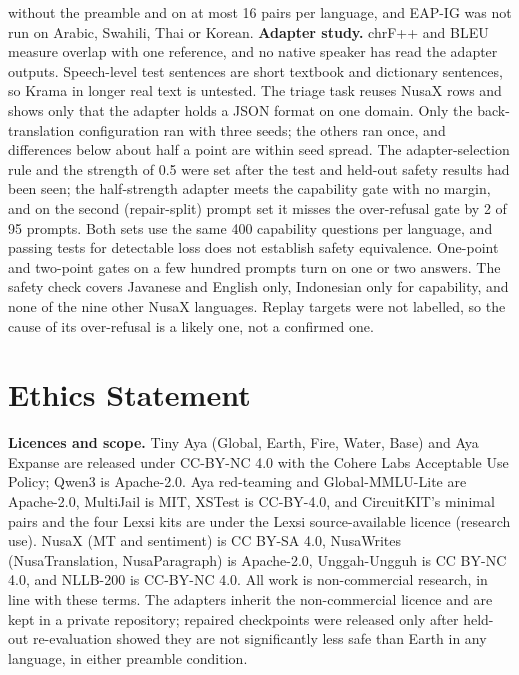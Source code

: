 \documentclass[11pt]{article}
\begin{document}
without the preamble and on at most 16 pairs per language, and EAP-IG was not run on Arabic, Swahili, Thai or
Korean.
\textbf{Adapter study.} chrF++ and BLEU measure overlap with one reference, and no native speaker has read the
adapter outputs. Speech-level test sentences are short textbook and dictionary sentences, so Krama in longer real
text is untested. The triage task reuses NusaX rows and shows only that the adapter holds a JSON format on one
domain. Only the back-translation configuration ran with three seeds; the others ran once, and differences
below about half a point are within seed spread. The adapter-selection rule and the strength of 0.5 were set after
the test and held-out safety results had been seen; the half-strength adapter meets the capability gate with no
margin, and on the second (repair-split) prompt set it misses the over-refusal gate by 2 of 95 prompts. Both sets
use the same 400 capability questions per language, and passing tests for detectable loss does not establish safety
equivalence. One-point and
two-point gates on a few hundred prompts turn on one or two answers. The safety check covers Javanese and English only, Indonesian only for capability, and none of the nine
other NusaX languages. Replay targets were not labelled, so the cause of its over-refusal is a likely one, not a
confirmed one.

\section*{Ethics Statement}

\textbf{Licences and scope.} Tiny Aya (Global, Earth, Fire, Water, Base) and Aya Expanse are released under
CC-BY-NC 4.0 with the Cohere Labs Acceptable Use Policy; Qwen3 is Apache-2.0. Aya red-teaming and
Global-MMLU-Lite are Apache-2.0, MultiJail is MIT, XSTest is CC-BY-4.0, and CircuitKIT's minimal pairs and the
four Lexsi kits are under the Lexsi source-available licence (research use). NusaX (MT and sentiment) is CC BY-SA
4.0, NusaWrites (NusaTranslation, NusaParagraph) is Apache-2.0, Unggah-Ungguh is CC BY-NC 4.0, and NLLB-200 is
CC-BY-NC 4.0. All work is
non-commercial research, in line with these terms. The adapters inherit the non-commercial licence and are kept
in a private repository; repaired checkpoints were released only after held-out re-evaluation showed they are not
significantly less safe than Earth in any language, in either preamble condition.
\end{document}
